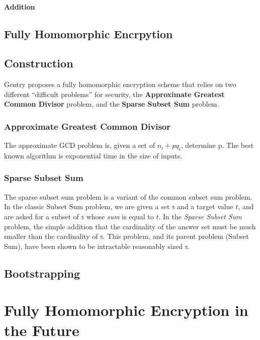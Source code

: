 \documentclass[a4paper,10pt]{article}
\begin{document}
\paragraph{Addition}

\subsection{Fully Homomorphic Encrpytion}

\subsection{Construction}
Gentry proposes a fully homomorphic encryption scheme that relies on
two different ``difficult problems'' for security, the
\textbf{Approximate Greatest Common Divisor} problem, and the
\textbf{Sparse Subset Sum} problem.

\subsubsection{Approximate Greatest Common Divisor}
The approximate GCD problem is, given a set of $ n _{i} + pq_{i} $,
determine p. The best known algorithm is exponential time in the size
of inputs.


\subsubsection{Sparse Subset Sum}
The sparse subset sum problem is a variant of the common subset sum
problem. In the classic Subset Sum problem, we are given a set $
\mathbb{s} $ and a target value $t$, and are asked for a subset of $
\mathbb{s} $ whose \textit{sum} is equal to $t$. In the \textit{Sparse
  Subset Sum} problem, the simple addition that the cardinality of the
answer set must be much smaller than the cardinality of $ \mathbb{s}
$. This problem, and its parent problem (Subset Sum), have been shown
to be intractable reasonably sized $ \mathbb{s} $.

\subsection{Bootstrapping}

\section{Fully Homomorphic Encryption in the Future}

\pagebreak

\end{document}
